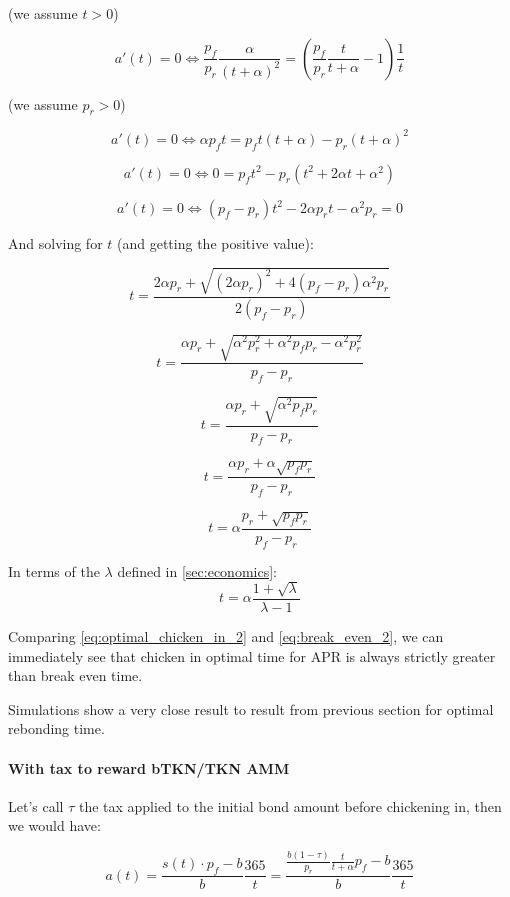 \documentclass{article}
\begin{document}
(we assume $t > 0$)

\[
a'(t) = 0 \iff \frac{p_f}{p_r} \frac{\alpha}{(t+\alpha)^2} = \left(\frac{p_f}{p_r} \frac{t}{t+\alpha} - 1\right) \frac{1}{t}
\]

(we assume $p_r > 0$)

\[
a'(t) = 0 \iff \alpha p_f t = p_f t(t+\alpha)  - p_r(t+\alpha)^2
\]

\[
a'(t) = 0 \iff 0 = p_f t^2 - p_r(t^2+2\alpha t+\alpha^2)
\]

\[
a'(t) = 0 \iff (p_f-p_r)t^2  - 2\alpha p_r t - \alpha^2 p_r = 0
\]

And solving for $t$ (and getting the positive value):

\[
t = \frac{2\alpha p_r + \sqrt{(2\alpha p_r)^2 + 4(p_f-p_r) \alpha^2 p_r}}{2(p_f-p_r)}
\]

\[
t = \frac{\alpha p_r + \sqrt{\alpha^2 p_r^2 + \alpha^2 p_f p_r- \alpha^2 p_r^2}}{p_f-p_r}
\]

\[
t = \frac{\alpha p_r + \sqrt{\alpha^2 p_f p_r}}{p_f-p_r}
\]

\[
t = \frac{\alpha p_r + \alpha \sqrt{p_f p_r}}{p_f-p_r}
\]

\begin{equation}
  \label{eq:optimal_chicken_in_1}
t = \alpha \frac{p_r + \sqrt{p_f p_r}}{p_f-p_r}
\end{equation}

In terms of the $\lambda$ defined in \ref{sec:economics}:
\begin{equation}
  \label{eq:optimal_chicken_in_2}
t = \alpha \frac{1 + \sqrt{\lambda}}{\lambda - 1}
\end{equation}

Comparing \ref{eq:optimal_chicken_in_2} and \ref{eq:break_even_2}, we can immediately see that chicken in optimal time for APR is always strictly greater than break even time.

Simulations show a very close result to result from previous section for optimal rebonding time.

\paragraph{With tax to reward bTKN/TKN AMM}
 Let’s call $\tau$ the tax applied to the initial bond amount before chickening in, then we would have:

\[
a(t) = \frac{s(t) \cdot p_f - b}{b} \frac{365}{t} = \frac{\frac{b(1-\tau)}{p_r} \frac{t}{t+\alpha} p_f - b}{b} \frac{365}{t}
\]
\end{document}

